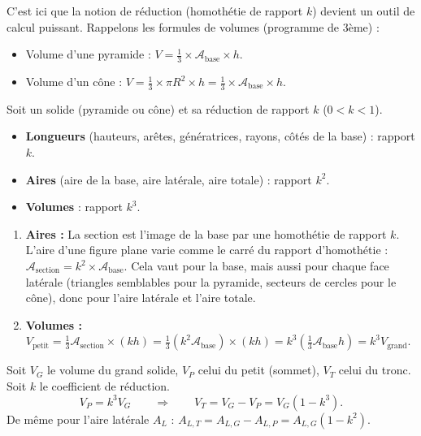 \documentclass[11pt]{article}
\begin{document}
C'est ici que la notion de réduction (homothétie de rapport $k$) devient un outil de calcul puissant. Rappelons les formules de volumes (programme de 3ème) :
\begin{itemize}
    \item Volume d'une pyramide : $V = \frac{1}{3} \times \mathcal{A}_{\text{base}} \times h$.
    \item Volume d'un cône : $V = \frac{1}{3} \times \pi R^2 \times h = \frac{1}{3} \times \mathcal{A}_{\text{base}} \times h$.
\end{itemize}

\begin{propriete}
Soit un solide (pyramide ou cône) et sa réduction de rapport $k$ ($0 < k < 1$).
\begin{itemize}
    \item \textbf{Longueurs} (hauteurs, arêtes, génératrices, rayons, côtés de la base) : rapport $k$.
    \item \textbf{Aires} (aire de la base, aire latérale, aire totale) : rapport $k^2$.
    \item \textbf{Volumes} : rapport $k^3$.
\end{itemize}
\end{propriete}

\begin{experience}
\begin{enumerate}
    \item \textbf{Aires :} La section est l'image de la base par une homothétie de rapport $k$. L'aire d'une figure plane varie comme le carré du rapport d'homothétie : $\mathcal{A}_{\text{section}} = k^2 \times \mathcal{A}_{\text{base}}$. Cela vaut pour la base, mais aussi pour chaque face latérale (triangles semblables pour la pyramide, secteurs de cercles pour le cône), donc pour l'aire latérale et l'aire totale.
    \item \textbf{Volumes :} $V_{\text{petit}} = \frac{1}{3} \mathcal{A}_{\text{section}} \times (k h) = \frac{1}{3} (k^2 \mathcal{A}_{\text{base}}) \times (k h) = k^3 \left( \frac{1}{3} \mathcal{A}_{\text{base}} h \right) = k^3 V_{\text{grand}}$.
\end{enumerate}
\end{experience}

\begin{aretenir}
Soit $V_G$ le volume du grand solide, $V_P$ celui du petit (sommet), $V_T$ celui du tronc. Soit $k$ le coefficient de réduction.
\[
V_P = k^3 V_G \qquad \Rightarrow \qquad V_T = V_G - V_P = V_G (1 - k^3).
\]
De même pour l'aire latérale $A_L$ : $A_{L,T} = A_{L,G} - A_{L,P} = A_{L,G} (1 - k^2)$.
\end{aretenir}
\end{document}
